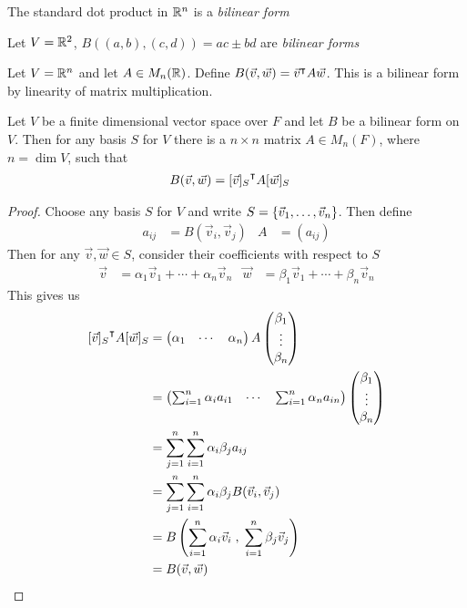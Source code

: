 \begin{defexample}
  The standard dot product in $\mathbb{R}^n$ is a \emph{bilinear form}
\end{defexample}

\begin{defexample}
  Let $V = \mathbb{R}^2$, $B((a,b),(c,d)) = ac \pm bd$ are \emph{bilinear forms}
\end{defexample}

\begin{defexample}
  Let $V = \mathbb{R}^n$ and let $A \in M_n(\mathbb{R})$.
  Define $B(\vec v, \vec w) = {\vec v}^{\intercal}A\vec w$.
  This is a bilinear form by linearity of matrix multiplication.
\end{defexample}

\begin{theorem}
  Let $V$ be a finite dimensional vector space over $F$ and let $B$ be a bilinear form on $V$.
  Then for any basis $S$ for $V$ there is a $n \times n$ matrix $A \in M_n(F)$, where $n = \dim V$, such that
    \begin{align}
      B(\vec v, \vec w) &= {[\vec v]_S}^{\intercal} A [\vec w]_S
    \end{align}
\end{theorem}
\begin{proof}
  Choose any basis $S$ for $V$ and write $S = \left\{\vec v_1,\ldots,\vec v_n\right\}$. Then define
    \begin{align}
      a_{ij} &= B(\vec v_i, \vec v_j) & A &= (a_{ij})
    \end{align}
  Then for any $\vec v, \vec w \in S$, consider their coefficients with respect to $S$
    \begin{align}
      \vec v &= \alpha_1 \vec v_1 + \cdots + \alpha_n \vec v_n &
      \vec w &= \beta_1 \vec v_1 + \cdots + \beta_n \vec v_n
    \end{align}
  This gives us
    \begin{align}
      {[\vec v]_S}^{\intercal} A [\vec w]_S
        &= \begin{pmatrix} \alpha_1 & \cdots & \alpha_n \end{pmatrix} A \begin{pmatrix} \beta_1 \\ \vdots \\ \beta_n \end{pmatrix} \\
        &= \begin{pmatrix} \sum_{i=1}^n\alpha_i a_{i1} & \cdots & \sum_{i=1}^n\alpha_n a_{in} \end{pmatrix} \begin{pmatrix} \beta_1 \\ \vdots \\ \beta_n \end{pmatrix} \\
        &= \sum_{j=1}^n\sum_{i=1}^n \alpha_i\beta_j a_{ij} \\
        &= \sum_{j=1}^n\sum_{i=1}^n \alpha_i\beta_j B(\vec v_i, \vec v_j) \\
        &= B\left(\sum_{i=1}^n\alpha_i\vec v_i\;,\;\sum_{i=1}^n\beta_j\vec v_j\right) \\
        &= B(\vec v, \vec w)
    \end{align}
\end{proof}

